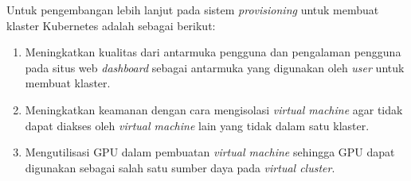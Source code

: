 Untuk pengembangan lebih lanjut pada sistem \emph{provisioning}
untuk membuat klaster Kubernetes adalah sebagai berikut:

\begin{enumerate}[nolistsep]

  \item Meningkatkan kualitas dari antarmuka pengguna dan pengalaman
    pengguna pada situs web \emph{dashboard} sebagai antarmuka
    yang digunakan oleh \emph{user} untuk membuat klaster.

  \item Meningkatkan keamanan dengan cara mengisolasi \emph{virtual machine}
    agar tidak dapat diakses oleh \emph{virtual machine} lain yang tidak
    dalam satu klaster.

  \item Mengutilisasi GPU dalam pembuatan \emph{virtual machine} sehingga
    GPU dapat digunakan sebagai salah satu sumber daya pada \emph{virtual cluster}.

\end{enumerate}
